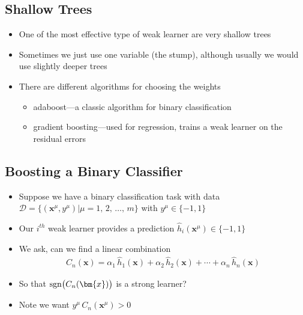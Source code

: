 
\begin{slide}
\section{Shallow Trees}

\begin{PauseHighLight}
  \begin{itemize}
  \item One of the most effective type of weak learner are very shallow
    trees\pause
  \item Sometimes we just use one variable (the stump)\pause, although
    usually we would use slightly deeper trees\pauseb
  \item There are different algorithms for choosing the weights
    \begin{itemize}
    \item adaboost\pause---a classic algorithm for binary classification\pauseb
    \item gradient boosting\pause---used for regression, trains a
      weak learner on the residual errors\pauseb
    \end{itemize}
  \end{itemize}
\end{PauseHighLight}

\end{slide}
\Outline %

\begin{slide}
\section[-1]{Boosting a Binary Classifier}

\begin{PauseHighLight}
  \begin{itemize}
  \item Suppose we have a binary classification task with data
    $\mathcal{D} = \{(\bm{x}^\mu, y^\mu)| \mu=1,\,2,\,\ldots,\,
    m\}$ with $y^\mu\in\{-1,1\}$\pause
  \item Our $i^{th}$ weak learner provides a prediction
    $\hat{h}_i(\bm{x}^\mu)\in \{-1,1\}$\pause
  \item We ask, can we find a linear combination
    \begin{align*}
      C_n(\bm{x}) = \alpha_1 \, \hat{h}_1(\bm{x}) + \alpha_2 \,
      \hat{h}_2(\bm{x}) + \cdots +  \alpha_n \, \hat{h}_n(\bm{x})
    \end{align*}
  \item So that $\mathrm{sgn}\!\left(\strut C_n(\bm{x}) \right)$ is a
    strong learner?\pause
  \item Note we want $y^\mu\,C_n(\bm{x}^\mu) >0$\pauseb
  \end{itemize}
\end{PauseHighLight}

\end{slide}

